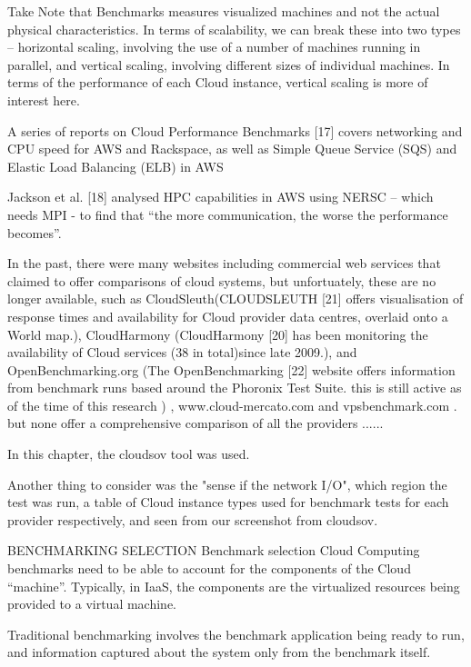 Take Note that Benchmarks measures visualized machines and not the actual physical characteristics. In terms of scalability, we can break these into two types – horizontal scaling, involving the use of a number of machines running in parallel, and vertical scaling, involving different sizes of individual machines. In terms of the performance of each Cloud instance, vertical scaling is more of interest here.


A series of reports on Cloud Performance Benchmarks [17] covers networking and CPU speed for AWS and Rackspace, as well as Simple Queue Service (SQS) and Elastic Load Balancing (ELB) in AWS


Jackson et al. [18] analysed HPC capabilities in AWS using NERSC – which needs MPI - to find that “the more communication, the worse the performance becomes”.

In the past, there were many websites including commercial web services that claimed to offer comparisons of cloud systems, but unfortuately, these are no longer available, such as CloudSleuth(CLOUDSLEUTH [21] offers visualisation of response times and availability for Cloud provider data centres, overlaid onto a World map.), CloudHarmony (CloudHarmony [20] has been monitoring the availability of Cloud services (38 in total)since late 2009.), and OpenBenchmarking.org (The OpenBenchmarking [22] website offers information from benchmark runs based around the Phoronix Test Suite. this is still active as of the time of this research ) , www.cloud-mercato.com and vpsbenchmark.com . but none offer a comprehensive comparison of all the providers ......

In this chapter, the cloudsov tool was used. 

Another thing to consider was the "sense if the network I/O", which region the test was run, a table of Cloud instance types used for benchmark tests for each provider respectively, and seen from our screenshot from cloudsov. 


BENCHMARKING SELECTION 
Benchmark selection Cloud Computing benchmarks need to be able to account for the components of the Cloud “machine”. Typically, in IaaS, the components are the virtualized resources being provided to a virtual machine.

Traditional benchmarking involves the benchmark application being ready to run, and information captured about the system only from the benchmark itself. 

